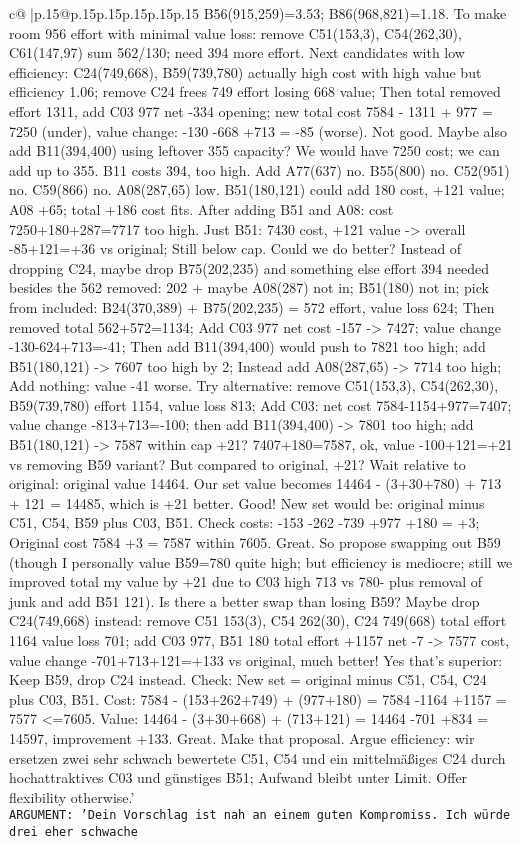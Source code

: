 \documentclass{article}
\begin{document}
{\begin{supertabular}{c@{$\;$}|p{.15\linewidth}@{}p{.15\linewidth}p{.15\linewidth}p{.15\linewidth}p{.15\linewidth}p{.15\linewidth}}
{{{B56(915,259)=3.53; B86(968,821)=1.18. To make room 956 effort with minimal value loss: remove C51(153,3), C54(262,30), C61(147,97) sum 562/130; need 394 more effort. Next candidates with low efficiency: C24(749,668), B59(739,780) actually high cost with high value but efficiency 1.06; remove C24 frees 749 effort losing 668 value; Then total removed effort 1311, add C03 977 net -334 opening; new total cost 7584 - 1311 + 977 = 7250 (under), value change: -130 -668 +713 = -85 (worse). Not good. Maybe also add B11(394,400) using leftover 355 capacity? We would have 7250 cost; we can add up to 355. B11 costs 394, too high. Add A77(637) no. B55(800) no. C52(951) no. C59(866) no. A08(287,65) low. B51(180,121) could add 180 cost, +121 value; A08 +65; total +186 cost fits. After adding B51 and A08: cost 7250+180+287=7717 too high. Just B51: 7430 cost, +121 value -> overall -85+121=+36 vs original; Still below cap. Could we do better? Instead of dropping C24, maybe drop B75(202,235) and something else effort 394 needed besides the 562 removed: 202 + maybe A08(287) not in; B51(180) not in; pick from included: B24(370,389) + B75(202,235) = 572 effort, value loss 624; Then removed total 562+572=1134; Add C03 977 net cost -157 -> 7427; value change -130-624+713=-41; Then add B11(394,400) would push to 7821 too high; add B51(180,121) -> 7607 too high by 2; Instead add A08(287,65) -> 7714 too high; Add nothing: value -41 worse. Try alternative: remove C51(153,3), C54(262,30), B59(739,780) effort 1154, value loss 813; Add C03: net cost 7584-1154+977=7407; value change -813+713=-100; then add B11(394,400) -> 7801 too high; add B51(180,121) -> 7587 within cap +21? 7407+180=7587, ok, value -100+121=+21 vs removing B59 variant? But compared to original, +21? Wait relative to original: original value 14464. Our set value becomes 14464 - (3+30+780) + 713 + 121 = 14485, which is +21 better. Good! New set would be: original minus {C51, C54, B59} plus {C03, B51}. Check costs: -153 -262 -739 +977 +180 = +3; Original cost 7584 +3 = 7587 within 7605. Great. So propose swapping out B59 (though I personally value B59=780 quite high; but efficiency is mediocre; still we improved total my value by +21 due to C03 high 713 vs 780- plus removal of junk and add B51 121). Is there a better swap than losing B59? Maybe drop C24(749,668) instead: remove C51 153(3), C54 262(30), C24 749(668) total effort 1164 value loss 701; add C03 977, B51 180 total effort +1157 net -7 -> 7577 cost, value change -701+713+121=+133 vs original, much better! Yes that’s superior: Keep B59, drop C24 instead. Check: New set = original minus {C51, C54, C24} plus {C03, B51}. Cost: 7584 - (153+262+749) + (977+180) = 7584 -1164 +1157 = 7577 <=7605. Value: 14464 - (3+30+668) + (713+121) = 14464 -701 +834 = 14597, improvement +133. Great. Make that proposal. Argue efficiency: wir ersetzen zwei sehr schwach bewertete C51, C54 und ein mittelmäßiges C24 durch hochattraktives C03 und günstiges B51; Aufwand bleibt unter Limit. Offer flexibility otherwise.'}\\ \tt ARGUMENT: {'Dein Vorschlag ist nah an einem guten Kompromiss. Ich würde drei eher schwache }}}
\end{supertabular}}
\end{document}
